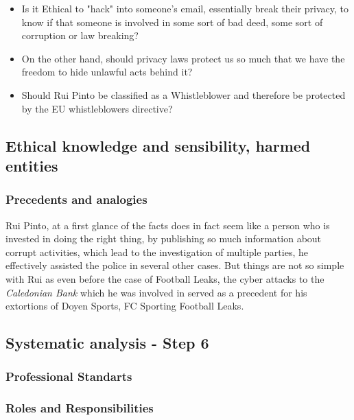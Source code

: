 \begin{itemize}
    \item Is it Ethical to "hack" into someone's email, essentially break their privacy, to know if that someone is involved in some sort of bad deed, some sort of corruption or law breaking?
    \item On the other hand, should privacy laws protect us so much that we have the freedom to hide unlawful acts behind it?
    \item Should Rui Pinto be classified as a Whistleblower and therefore be protected by the EU whistleblowers directive?
\end{itemize}

\subsection{Ethical knowledge and sensibility, harmed entities}
\subsubsection{Precedents and analogies}
Rui Pinto, at a first glance of the facts does in fact seem like a person who is invested in doing the right thing, by publishing so much information about corrupt activities, which lead to the investigation of multiple parties, he effectively assisted the police in several other cases.
But things are not so simple with Rui as even before the case of Football Leaks, the cyber attacks to the \textit{Caledonian Bank} which he was involved in served as a precedent for his extortions of Doyen Sports, FC Sporting  Football Leaks.




\subsection{Systematic analysis - Step 6}

\subsubsection{Professional Standarts}

\subsubsection{Roles and Responsibilities}


